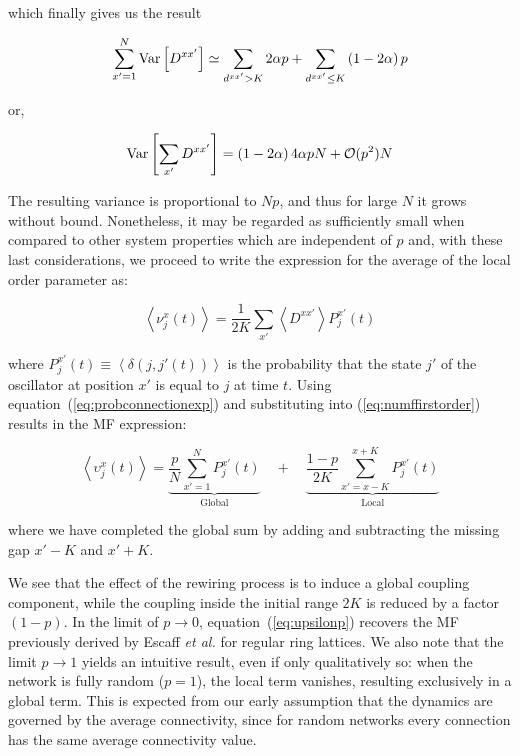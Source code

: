 \noindent which finally gives us the result

\begin{equation*}
  \sum\limits_{x'=1}^N\text{Var}\left[{D^{xx'}}\right] \simeq \sum_{d^{xx'} > K} 2\alpha p + \sum_{d^{xx'} \leq K} \left( 1-2\alpha \right)p
\end{equation*}

\noindent or,

\begin{equation}
  \text{Var}\left[{\sum_{x'}D^{xx'}}\right] = \left(1-2\alpha\right)4\alpha pN + \mathcal{O}(p^2)N
\end{equation}

The resulting variance is proportional to $Np$, and thus for large $N$ it grows without bound. Nonetheless, it may be regarded as
sufficiently small when compared to other system properties which are independent of $p$ and, with these last considerations, we
proceed to write the expression for the average of the local order parameter as:

\begin{equation}
  \left< \nu^x_j(t) \right> = \frac{1}{2K} \sum_{x'}\left< D^{xx'} \right> P^{x'}_j(t)
  \label{eq:numffirstorder}
\end{equation}

\noindent where $P^{x'}_j(t) \equiv \left< \delta(j,j'(t)) \right>$ is the probability that the state $j'$ of the oscillator at
position $x'$ is equal to $j$ at time $t$.  Using equation~(\ref{eq:probconnectionexp}) and substituting into (\ref{eq:numffirstorder})
results in the MF expression:

\begin{equation}
  \left< \upsilon_j^x(t) \right> = \underbrace{\frac{p}{N}\sum_{x'=1}^N P_j^{x'}(t)}_{\text{Global}}
  \quad + \quad \underbrace{\frac{1-p}{2K}\sum_{x'=x-K}^{x+K} P_j^{x'}(t)}_{\text{Local}}
  \label{eq:upsilonp}
\end{equation}

\noindent where we have completed the global sum by adding and subtracting the missing gap $x'-K$ and $x'+K$.

We see that the effect of the rewiring process is to induce a global coupling component, while the coupling inside the initial range
$2K$ is reduced by a factor $(1-p)$. In the limit of $p\to 0$, equation~(\ref{eq:upsilonp}) recovers the MF previously derived by
Escaff \textit{et al.} for regular ring lattices\cite{escaff2014arrays}. We also note that the limit $p\to 1$ yields an intuitive
result, even if only qualitatively so: when the network is fully random ($p=1$), the local term vanishes, resulting exclusively in a
global term. This is expected from our early assumption that the dynamics are governed by the average connectivity, since for random
networks every connection has the same average connectivity value.

